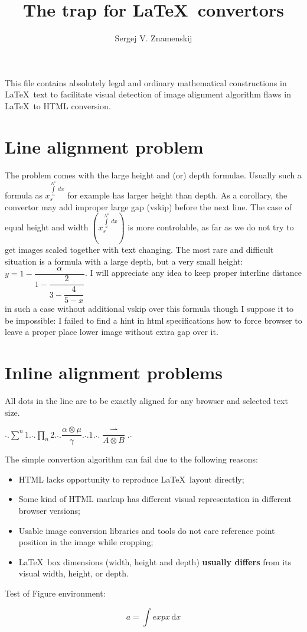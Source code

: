 \documentclass[12pt]{amsart}
\title{The trap for \LaTeX\ convertors}
\author{Sergej V. Znamenskij}
\begin{document}
\maketitle

This file contains absolutely legal and ordinary
mathematical constructions in \LaTeX\ text to facilitate visual
detection of image alignment algorithm flaws in \LaTeX\ to HTML conversion.

\section {Line alignment problem}
The problem comes with the large height and (or) depth formulae. 
Usually such a formula as $x_s^{\int\limits_a^{N^1}\, dx}$ for example has
larger height than depth. As a corollary, the convertor may add improper large gap (vskip) before the next
line. The case of equal height and width $\left(x_s^{\int\limits_a^{N^1}\, dx}\right)$ is more controlable, 
as far as we do not try to get images scaled together with text changing.
The most rare and difficult situation is a formula with a large depth, but a very small height: 
$y=1-\dfrac{\alpha}{1-\dfrac{2}{3-\dfrac{4}{5-x}}}$.
I will appreciate any idea to keep proper interline distance in such a case without 
additional vskip over this formula though I suppose it to be impossible: I failed to find a hint in html 
specifications how to force browser to leave a proper place lower image without extra gap over it. 

\section {Inline alignment problems}All dots in the line are to be exactly aligned for any browser and selected text size.

.$.\sum\limits^n1.$.$.\prod\limits_n2.$.$.\dfrac{\alpha\otimes\mu}{\gamma}.$.$.1.$.$.\dfrac {\rightharpoonup}{A\otimes B}.$.

The simple convertion algorithm can fail due to the following reasons:
\begin {itemize} 
\item HTML lacks opportunity to reproduce \LaTeX\ layout directly;
\item Some kind of HTML markup has different visual representation in different browser versions;  
\item Usable image conversion libraries and tools do not care reference point position in the image while cropping;
\item \LaTeX\ box dimensions (width, height and depth) \textbf{usually differs} from its visual width, height, or depth. 
\end {itemize}

Test of Figure environment:
\begin{figure}
\[ a = \int exp{x} \,\mathrm{d}x \]
\end{figure}
\end{document}

